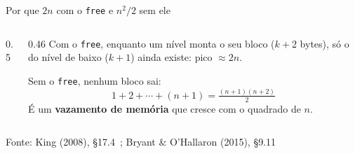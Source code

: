 \documentclass[aspectratio=169]{beamer}
\newcommand{\fonte}[1]{\vfill\hfill{\scriptsize\textcolor{UFSGray}{Fonte: #1}}}
\begin{document}
\begin{frame}{Por que $2n$ com o \texttt{free} e $n^2/2$ sem ele}
  \begin{columns}[c]
    \begin{column}{0.5\textwidth}
      \begin{center}
      \end{center}
    \end{column}
    \begin{column}{0.46\textwidth}
      \small
      Com o \texttt{free}, enquanto um nível monta o seu bloco ($k+2$
      bytes), só o do nível de baixo ($k+1$) ainda existe: pico
      $\approx 2n$.

      \medskip
      Sem o \texttt{free}, nenhum bloco sai:
      \[
        1 + 2 + \cdots + (n+1) = \tfrac{(n+1)(n+2)}{2}
      \]
      É um \textbf{vazamento de memória} que cresce com o quadrado de $n$.
    \end{column}
  \end{columns}
  \fonte{King (2008), §17.4~\cite{king2008c};
    Bryant \& O'Hallaron (2015), §9.11~\cite{bryant2015computer}}
\end{frame}
\end{document}
